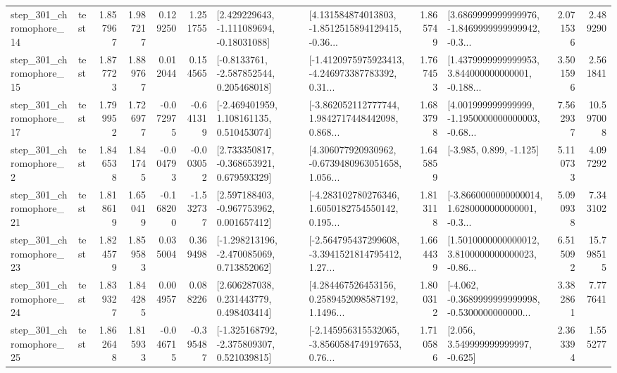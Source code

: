 \begin{tabular}{llrrrrllrlrr}
  step\_301\_chromophore\_14 &      test &      1.857967 &    1.987217 &      0.129250 &  1.251755 &    [2.429229643, -1.111089694, -0.18031088] &  [4.131584874013803, -1.8512515894129415, -0.36... &       1.865749 &  [3.6869999999999976, -1.8469999999999942, -0.3... &            2.071536 &          2.489290 \\
  step\_301\_chromophore\_15 &      test &      1.877723 &    1.889767 &      0.012044 &  0.154565 &     [-0.8133761, -2.587852544, 0.205468018] &  [-1.4120975975923413, -4.246973387783392, 0.31... &       1.767453 &  [1.4379999999999953, 3.844000000000001, -0.188... &            3.501596 &          2.561841 \\
  step\_301\_chromophore\_17 &      test &      1.799952 &    1.726977 &     -0.072975 & -0.641319 &    [-2.469401959, 1.108161135, 0.510453074] &  [-3.862052112777744, 1.9842717448442098, 0.868... &       1.683798 &  [4.001999999999999, -1.1950000000000003, -0.68... &            7.562937 &         10.597008 \\
   step\_301\_chromophore\_2 &      test &      1.846538 &    1.841745 &     -0.004793 & -0.003052 &    [2.733350817, -0.368653921, 0.679593329] &  [4.306077920930962, -0.6739480963051658, 1.056... &       1.645859 &                            [-3.985, 0.899, -1.125] &            5.110733 &          4.097292 \\
  step\_301\_chromophore\_21 &      test &      1.818619 &    1.650419 &     -0.168200 & -1.532737 &    [2.597188403, -0.967753962, 0.001657412] &  [-4.283102780276346, 1.6050182754550142, 0.195... &       1.813118 &  [-3.8660000000000014, 1.6280000000000001, -0.3... &            5.090938 &          7.343102 \\
  step\_301\_chromophore\_23 &      test &      1.824579 &    1.859583 &      0.035004 &  0.369498 &   [-1.298213196, -2.470085069, 0.713852062] &  [-2.564795437299608, -3.3941521814795412, 1.27... &       1.664439 &  [1.5010000000000012, 3.8100000000000023, -0.86... &            6.515092 &         15.798515 \\
  step\_301\_chromophore\_24 &      test &      1.839327 &    1.844285 &      0.004957 &  0.088226 &     [2.606287038, 0.231443779, 0.498403414] &  [4.284467526453156, 0.2589452098587192, 1.1496... &       1.800312 &  [-4.062, -0.3689999999999998, -0.5300000000000... &            3.382861 &          7.777641 \\
  step\_301\_chromophore\_25 &      test &      1.862648 &    1.815933 &     -0.046715 & -0.395487 &   [-1.325168792, -2.375809307, 0.521039815] &  [-2.145956315532065, -3.8560584749197653, 0.76... &       1.710586 &                 [2.056, 3.549999999999997, -0.625] &            2.363394 &          1.555277 \\

\end{tabular}
